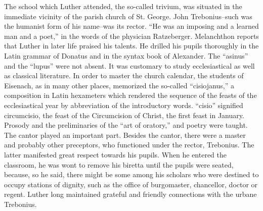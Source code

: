 The school which Luther attended, the so-called trivium, was
situated in the immediate vicinity of the parish church of St. George.
John Trebonius--such was the humanist form of his name--was its
rector. “He was an imposing and a learned man and a poet,” in the
words of the physician Ratzeberger. Melanchthon reports that Luther
in later life praised his talents. He drilled his pupils thoroughly in
the Latin grammar of Donatus and in the syntax book of Alexander.
The “asinus” and the “lupus” were not absent. It was customary to
study ecclesiastical as well as classical literature. In order to master
the church calendar, the students of Eisenach, as in many other places,
memorized the so-called “cisiojanus,” a composition in Latin hexameters which rendered the sequence of the feasts of the ecclesiastical
year by abbreviation of the introductory words. “cisio” signified circumcisio, the feast of the Circumcision of Christ, the first feast
in January. Prosody and the preliminaries of the “art of oratory,” and
poetry were taught. The cantor played an important part. Besides
the cantor, there were a master and probably other preceptors, who
functioned under the rector, Trebonius. The latter manifested great
respect towards his pupils. When he entered the classroom, he was
wont to remove his biretta until the pupils were seated, because, so he
said, there might be some among his scholars who were destined to
occupy stations of dignity, such as the office of burgomaster, chancellor, doctor or regent. Luther long maintained grateful and friendly
connections with the urbane Trebonius.

